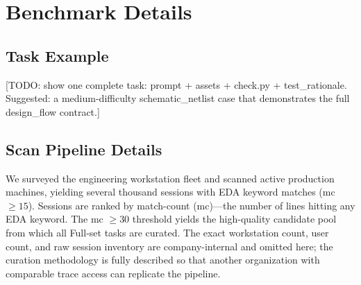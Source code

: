 \section{Benchmark Details}
\label{sec:benchmark-details}


\subsection{Task Example}
\label{sec:task-example}

[TODO: show one complete task: prompt + assets + check.py + test\_rationale. Suggested: a medium-difficulty schematic\_netlist case that demonstrates the full design\_flow contract.]

\subsection{Scan Pipeline Details}
\label{sec:scan-pipeline}

We surveyed the engineering workstation fleet and scanned active production machines, yielding several thousand sessions with EDA keyword matches (mc $\geq 15$). Sessions are ranked by match-count (mc)---the number of lines hitting any EDA keyword. The mc $\geq 30$ threshold yields the high-quality candidate pool from which all \Ntasks{} Full-set tasks are curated. The exact workstation count, user count, and raw session inventory are company-internal and omitted here; the curation methodology is fully described so that another organization with comparable trace access can replicate the pipeline.

